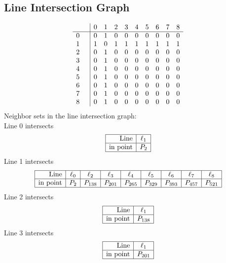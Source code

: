 \documentclass{article}
\begin{document}
{\subsection*{Line Intersection Graph}
{\arraycolsep=1pt
$$
\begin{array}{rr|*{9}r}
 &  & 0 & 1 & 2 & 3 & 4 & 5 & 6 & 7 & 8\\
\hline
0 &  & 0 & 1 & 0 & 0 & 0 & 0 & 0 & 0 & 0\\
1 &  & 1 & 0 & 1 & 1 & 1 & 1 & 1 & 1 & 1\\
2 &  & 0 & 1 & 0 & 0 & 0 & 0 & 0 & 0 & 0\\
3 &  & 0 & 1 & 0 & 0 & 0 & 0 & 0 & 0 & 0\\
4 &  & 0 & 1 & 0 & 0 & 0 & 0 & 0 & 0 & 0\\
5 &  & 0 & 1 & 0 & 0 & 0 & 0 & 0 & 0 & 0\\
6 &  & 0 & 1 & 0 & 0 & 0 & 0 & 0 & 0 & 0\\
7 &  & 0 & 1 & 0 & 0 & 0 & 0 & 0 & 0 & 0\\
8 &  & 0 & 1 & 0 & 0 & 0 & 0 & 0 & 0 & 0\\
\end{array}
$$
}%
Neighbor sets in the line intersection graph:\\
Line 0 intersects 
$$
\begin{array}{|r*{1}{|c}|}
\hline
\mbox{Line}  & \ell_{1}\\
\hline
\mbox{in point}  & P_{2}\\
\hline
\end{array}
$$
Line 1 intersects 
$$
\begin{array}{|r*{8}{|c}|}
\hline
\mbox{Line}  & \ell_{0} & \ell_{2} & \ell_{3} & \ell_{4} & \ell_{5} & \ell_{6} & \ell_{7} & \ell_{8}\\
\hline
\mbox{in point}  & P_{2} & P_{138} & P_{201} & P_{265} & P_{329} & P_{393} & P_{457} & P_{521}\\
\hline
\end{array}
$$
Line 2 intersects 
$$
\begin{array}{|r*{1}{|c}|}
\hline
\mbox{Line}  & \ell_{1}\\
\hline
\mbox{in point}  & P_{138}\\
\hline
\end{array}
$$
Line 3 intersects 
$$
\begin{array}{|r*{1}{|c}|}
\hline
\mbox{Line}  & \ell_{1}\\
\hline
\mbox{in point}  & P_{201}\\
\hline
\end{array}
$$}
\end{document}
